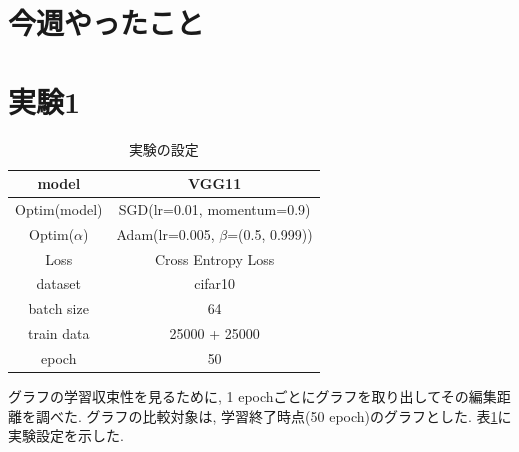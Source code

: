\documentclass[twocolumn]{jarticle}     %
\begin{document}


\section{今週やったこと}


\section{実験1}

\begin{table}[tb]
  \begin{center}
    \caption{実験の設定}
    \begin{tabular}{|c|c|} \hline
      model & VGG11 \\ \hline
      Optim(model) & SGD(lr=0.01, momentum=0.9) \\ \hline
      Optim($\alpha$) & Adam(lr=0.005, $\beta$=(0.5, 0.999)) \\ \hline
      Loss & Cross Entropy Loss \\ \hline
      dataset & cifar10 \\ \hline
      batch size & 64 \\ \hline
      train data & 25000 + 25000 \\ \hline
      epoch & 50 \\ \hline
    \end{tabular}
    \label{tab:setting}
  \end{center}
\end{table}

グラフの学習収束性を見るために, 1 epochごとにグラフを取り出してその編集距離を調べた.
グラフの比較対象は, 学習終了時点(50 epoch)のグラフとした.
表\ref{tab:setting}に実験設定を示した.
\end{document}
